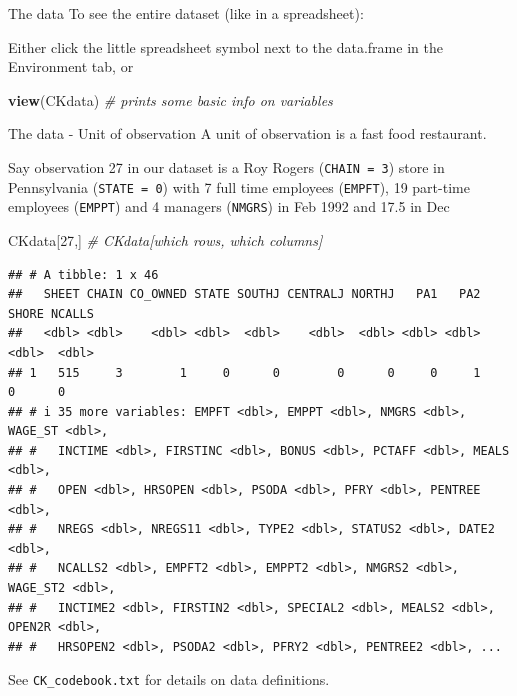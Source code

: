 \documentclass[
  ignorenonframetext,
]{beamer}
\newenvironment{Shaded}{\begin{snugshade}}{\end{snugshade}}
\newcommand{\CommentTok}[1]{\textcolor[rgb]{0.56,0.35,0.01}{\textit{#1}}}
\newcommand{\DecValTok}[1]{\textcolor[rgb]{0.00,0.00,0.81}{#1}}
\newcommand{\FunctionTok}[1]{\textcolor[rgb]{0.13,0.29,0.53}{\textbf{#1}}}
\newcommand{\NormalTok}[1]{#1}
\begin{document}
\begin{frame}[fragile]{The data}
\label{the-data-1}
To see the entire dataset (like in a spreadsheet):

Either click the little spreadsheet symbol next to the data.frame in the
Environment tab, or

\begin{Shaded}
\begin{Highlighting}[]
\FunctionTok{view}\NormalTok{(CKdata)  }\CommentTok{\# prints some basic info on variables}
\end{Highlighting}
\end{Shaded}
\end{frame}

\begin{frame}[fragile]{The data - Unit of observation}
\label{the-data---unit-of-observation}
A unit of observation is a fast food restaurant.

Say observation 27 in our dataset is a Roy Rogers (\texttt{CHAIN = 3})
store in Pennsylvania (\texttt{STATE = 0}) with 7 full time employees
(\texttt{EMPFT}), 19 part-time employees (\texttt{EMPPT}) and 4 managers
(\texttt{NMGRS}) in Feb 1992 and 17.5 in Dec

\begin{Shaded}
\begin{Highlighting}[]
\NormalTok{CKdata[}\DecValTok{27}\NormalTok{,]  }\CommentTok{\# CKdata[which rows, which columns]}
\end{Highlighting}
\end{Shaded}

\begin{verbatim}
## # A tibble: 1 x 46
##   SHEET CHAIN CO_OWNED STATE SOUTHJ CENTRALJ NORTHJ   PA1   PA2 SHORE NCALLS
##   <dbl> <dbl>    <dbl> <dbl>  <dbl>    <dbl>  <dbl> <dbl> <dbl> <dbl>  <dbl>
## 1   515     3        1     0      0        0      0     0     1     0      0
## # i 35 more variables: EMPFT <dbl>, EMPPT <dbl>, NMGRS <dbl>, WAGE_ST <dbl>,
## #   INCTIME <dbl>, FIRSTINC <dbl>, BONUS <dbl>, PCTAFF <dbl>, MEALS <dbl>,
## #   OPEN <dbl>, HRSOPEN <dbl>, PSODA <dbl>, PFRY <dbl>, PENTREE <dbl>,
## #   NREGS <dbl>, NREGS11 <dbl>, TYPE2 <dbl>, STATUS2 <dbl>, DATE2 <dbl>,
## #   NCALLS2 <dbl>, EMPFT2 <dbl>, EMPPT2 <dbl>, NMGRS2 <dbl>, WAGE_ST2 <dbl>,
## #   INCTIME2 <dbl>, FIRSTIN2 <dbl>, SPECIAL2 <dbl>, MEALS2 <dbl>, OPEN2R <dbl>,
## #   HRSOPEN2 <dbl>, PSODA2 <dbl>, PFRY2 <dbl>, PENTREE2 <dbl>, ...
\end{verbatim}

See \texttt{CK\_codebook.txt} for details on data definitions.
\end{frame}
\end{document}

